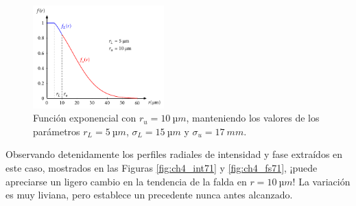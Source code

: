 \begin{figure}[htbp]
  \centering
  \includegraphics[width=0.45\textwidth]{Figuras/ch4_fexp1.pdf}
  \caption{Función exponencial con $r_{u}=\qty{10}{µm}$, manteniendo los valores de los parámetros $r_{L}=\qty{5}{µm}$, $\sigma_{L}=\qty{15}{µm}$ y $\sigma_{u}=\qty{17}{mm}$.}
  \label{fig:4.28}
\end{figure}

Observando detenidamente los perfiles radiales de intensidad y fase extraídos en este caso, mostrados en las Figuras \ref{fig:ch4_int71} y \ref{fig:ch4_fs71}, ¡puede apreciarse un ligero cambio en la tendencia de la falda en $r=\qty{10}{µm}$! La variación es muy liviana, pero establece un precedente nunca antes alcanzado.

